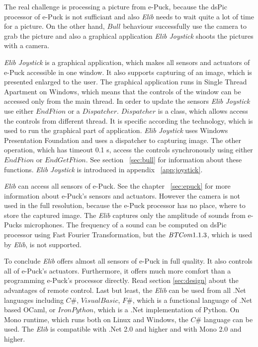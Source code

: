 \documentclass[12pt,notitlepage]{report}
\begin{document}
	The real challenge is processing a picture from e-Puck, because the dsPic processor of e-Puck is not sufficiant
	and also {\it Elib} needs to wait quite a lot of time for a picture.
	On the other hand, $Bull$ behaviour successfully use the camera to grab the picture
	and also a graphical application {\it Elib Joystick} shoots the pictures with a camera.

	{\it Elib Joystick} is a graphical application, which makes all sensors and actuators of e-Puck accessible in one window.
	It also supports capturing of an image, which is presented enlarged to the user.
	The graphical application runs in Single Thread Apartment on Windows, which means that the controls of the window can 
	be accessed only from the main thread.
	In order to update the sensors {\it Elib Joystick} use either $EndFtion$ or a $Dispatcher$.
	$Dispatcher$ is a class, which allows access the controls from different thread. It is specific according the technology,
	which is used to run the graphical part of application. {\it Elib Joystick} uses Windows Presentation Foundation and
	uses a dispatcher to capturing image. The other operation, which has timeout 0.1 s, access the controls synchronously using
	either $EndFtion$ or $EndGetFtion$. See section ~\ref{sec:bull} for information about these functions.
	{\it Elib Joystick} is introduced in appendix ~\ref{app:joystick}.

	{\it Elib} can access all sensors of e-Puck. See the chapter ~\ref{sec:epuck} for more information about e-Puck's sensors and actuators.
	However the camera is not used in the full resolution,
	because the e-Puck processor has no place, where to store the captured image.
	The {\it Elib} captures only the amplitude of sounds from e-Pucks microphones. 
	The frequency of a sound can be computed on dsPic processor
	using Fast Fourier Transformation, but the ${\it BTCom} 1.1.3$, which is used by {\it Elib}, is not supported.

	To conclude {\it Elib} offers almost all sensors of e-Puck in full quality. It also controls all of e-Puck's actuators.
	Furthermore, it offers much more comfort than a programming e-Puck's processor directly. 
	Read section \ref{sec:design} about the advantages
	of remote control. 
	Last but least, the {\it Elib} can be used from all .Net languages including $C\#$, $Visual Basic$, $F\#$,
	which is a functional language of .Net based OCaml,
	or $Iron Python$, which is a .Net implementation of Python. On Mono runtime, 
	which runs both on Linux and Windows, the $C\#$ language can be used.
	The {\it Elib} is compatible with .Net 2.0\cite{net} and higher and with Mono\cite{mono} 2.0 and higher.
\end{document}
